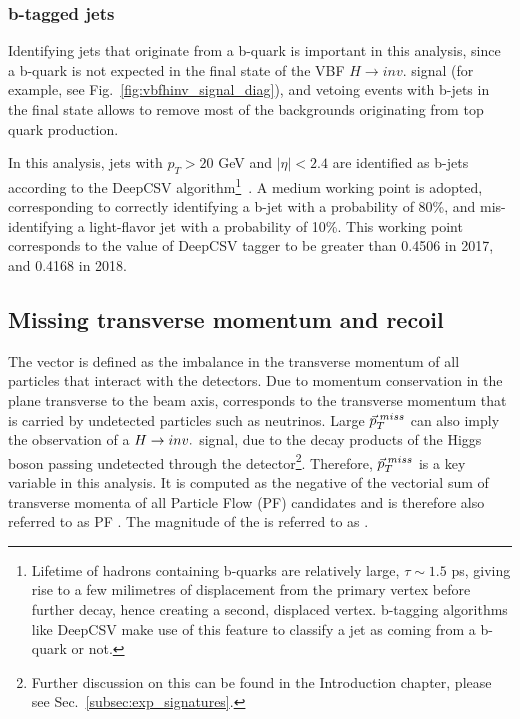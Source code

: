 \subsubsection{b-tagged jets}
\label{subsec:objects_bjets}

Identifying jets that originate from a b-quark is important in this analysis, since a b-quark is not expected in the
final state of the VBF $H \rightarrow inv.$ signal (for example, see Fig.~\ref{fig:vbfhinv_signal_diag}), 
and vetoing events with b-jets in the final state allows to remove most of the 
backgrounds originating from top quark production.

In this analysis, jets with $p_{T} > 20$ GeV and $|\eta| < 2.4$ are identified as b-jets according to the
DeepCSV algorithm\footnote{Lifetime of hadrons containing b-quarks are
relatively large, $\tau \sim 1.5$ ps, giving rise to a few milimetres of displacement from the primary vertex
before further decay, hence creating a second, displaced vertex. b-tagging algorithms like DeepCSV make use of
this feature to classify a jet as coming from a b-quark or not.}~\cite{Sirunyan:2017ezt}. 
A medium working point is adopted, corresponding to correctly identifying a b-jet with a
probability of 80\%, and mis-identifying a light-flavor jet with a probability of 10\%. This working point corresponds to the value of 
DeepCSV tagger to be greater than 0.4506 in 2017, and 0.4168 in 2018.

\subsection{Missing transverse momentum and recoil}
\label{subsec:objects_met_recoil}

The vector \ptvecmiss is defined as the imbalance in the transverse
momentum of all particles that interact with the detectors.
Due to momentum conservation in the plane transverse to the beam axis, \ptvecmiss
corresponds to the transverse momentum that is carried by undetected particles such as neutrinos.
Large $\vec{p}_{T}^{\;miss}$ can also imply the observation of a $H \rightarrow inv.$ signal, due to the decay products
of the Higgs boson passing undetected through the detector\footnote{Further discussion
on this can be found in the Introduction chapter, please see Sec.~\ref{subsec:exp_signatures}.}.
Therefore, $\vec{p}_{T}^{\;miss}$ is a key variable in this analysis.   
It is computed as the negative of the vectorial sum of transverse
momenta of all Particle Flow (PF) candidates and is therefore also referred to as PF \ptvecmiss.
The magnitude of the \ptvecmiss is referred to as \ptmiss.

